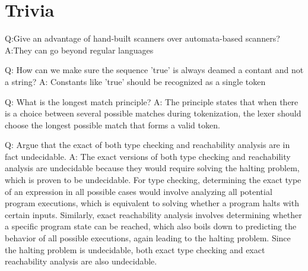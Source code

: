 \section{Trivia}
Q:Give an advantage of hand-built scanners over automata-based scanners? 
A:They can go beyond regular languages

Q: How can we make sure the sequence 'true' is always deamed a contant and not a string?
A: Constants like 'true' should be recognized as a single token

Q: What is the longest match principle?
A: The principle states that when there is a choice between several possible matches during tokenization, the lexer should choose the longest possible match that forms a valid token.

Q: Argue that the exact of both type checking and reachability analysis are in fact undecidable.
A: The exact versions of both type checking and reachability analysis are undecidable because they would require solving the halting problem, which is proven to be undecidable. For type checking, determining the exact type of an expression in all possible cases would involve analyzing all potential program executions, which is equivalent to solving whether a program halts with certain inputs. Similarly, exact reachability analysis involves determining whether a specific program state can be reached, which also boils down to predicting the behavior of all possible executions, again leading to the halting problem. Since the halting problem is undecidable, both exact type checking and exact reachability analysis are also undecidable.
